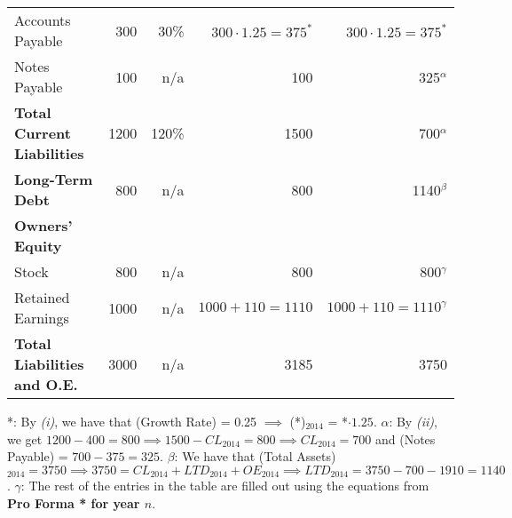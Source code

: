\documentclass{letter}
\begin{document}
\begin{tabular}{l r r r r}
    Accounts Payable & 300 & 30\% & $300 \cdot 1.25 = 375^*$ & $300 \cdot 1.25 = 375^*$ \\
    Notes Payable & 100 & n/a & 100 & 325$^{\alpha}$ \\
    \textbf{Total Current Liabilities} & 1200 & 120\% & 1500 & 700$^{\alpha}$ \\
    \midrule
    \textbf{Long-Term Debt} & 800 & n/a & 800 & 1140$^{\beta}$ \\
    \midrule
    \textbf{Owners' Equity} \\
    Stock & 800 & n/a & 800 & 800$^{\gamma}$ \\
    Retained Earnings & 1000 & n/a & $1000 + 110 = 1110$ & $1000 + 110 = 1110^{\gamma}$ \\
    \midrule
    \textbf{Total Liabilities and O.E.} & 3000 & n/a & 3185 & 3750 \\
    \bottomrule
\end{tabular}
\newline
*: By \textit{(i)}, we have that (Growth Rate) = 0.25 $\implies$ (*)$_{2014}$ = *$\cdot 1.25$.
\newline
$\alpha$: By \textit{(ii)}, we get $1200 - 400 = 800 \implies 1500 - CL_{2014} = 800 \implies CL_{2014} = 700$ and
(Notes Payable) = $700 - 375 = 325$.
\newline
$\beta$: We have that (Total Assets)$_{2014} = 3750 \implies 3750 = CL_{2014} + LTD_{2014} + OE_{2014} 
\implies LTD_{2014} = 3750 - 700 - 1910 = 1140$.
\newline
$\gamma$: The rest of the entries in the table are filled out using the equations from \textbf{Pro Forma * for year $n$}.
\end{document}
